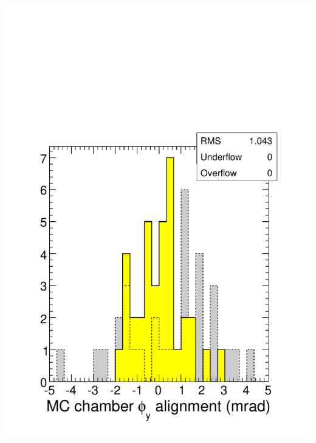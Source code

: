 \documentclass[compress]{beamer}
\begin{document}
\begin{frame}
\vfill
\begin{columns}
\includegraphics[width=\linewidth]{mcchamber_phiy.pdf}

\end{columns}
\end{frame}
\end{document}
